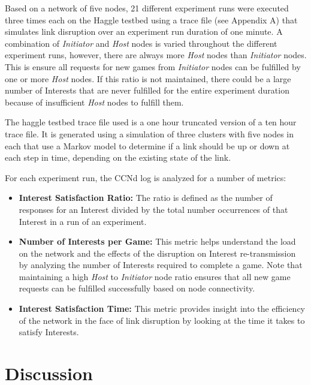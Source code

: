\documentclass[a4paper,12pt]{report}      %
\begin{document}
Based on a network of five nodes, 21 different experiment runs were executed three times each on the Haggle testbed
using a trace file (see Appendix A) that simulates link disruption over an experiment run duration of one minute. A
combination of \emph{Initiator} and \emph{Host} nodes is varied throughout the different experiment runs, however, there are always
more \emph{Host} nodes than \emph{Initiator} nodes. This is ensure all requests for new games from \emph{Initiator} nodes can be fulfilled
by one or more \emph{Host} nodes. If this ratio is not maintained, there could be a large number of Interests that are never
fulfilled for the entire experiment duration because of insufficient \emph{Host} nodes to fulfill them. 

The haggle testbed trace file used is a one hour truncated version of a ten hour trace file\cite{haggletrc}. It is generated using a simulation of three clusters with five nodes in each that use a Markov model to determine if a link should be up or down at each step in time, depending on the existing state of the link.

\noindent For each experiment run, the CCNd log is analyzed for a number of metrics:

\begin{itemize}
\item \textbf{Interest Satisfaction Ratio:} The ratio is defined as the number of responses for an Interest divided
 by the total number occurrences of that Interest in a run of an experiment.

\item \textbf{Number of Interests per Game:} This metric helps understand the load on the network and the
effects of the disruption on Interest re-transmission by analyzing the number of Interests
required to complete a game. Note that maintaining a high \emph{Host} to \emph{Initiator} node ratio ensures
that all new game requests can be fulfilled successfully based on node connectivity.

\item \textbf{Interest Satisfaction Time:} This metric provides insight into the efficiency of the network in the
face of link disruption by looking at the time it takes to satisfy Interests.
\end{itemize}

\section{Discussion}
\end{document}
